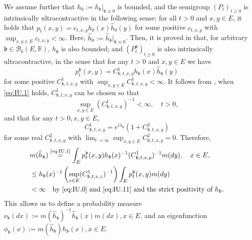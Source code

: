 \documentclass[12pt,a4paper]{amsart}
\numberwithin{equation}{section}
\theoremstyle{plain}
\theoremstyle{definition}
\theoremstyle{remark}
\begin{document}
	We assume further that $h_0:= h_\mathfrak b|_{\mathfrak{b} \equiv 0}$ is bounded, and the semigroup $(P_t)_{t\geq 0}$ is intrinsically ultracontractive in the following sense: for all $t>0$ and $x, y \in E$, it holds that $p_t(x,y) = c_{t,x,y} h_0(x) \widehat h_0(y)$ for some positive $c_{t,x,y}$ with $\sup_{x,y \in E} c_{t,x,y}< \infty$.
	Here, $\widehat h_0 := \widehat h_\mathfrak b|_{\mathfrak{b}\equiv 0}$.
	Then, it is proved in \cite{RenSongZhang2015Limit, RenSongZhang2017Central} that, for arbitrary $\mathfrak b \in \mathcal B_b(E,\mathbb R)$, $h_\mathfrak b$ is also bounded; and $(P_t^\mathfrak b)_{t\geq 0}$ is also intrinsically ultracontractive, in the sense that for any $t> 0$ and $x,y \in E$ we have
\begin{equation} \label{eq:IU.1}
	p^\mathfrak b_t(x,y)
		  = C^1_{\mathfrak b,t,x,y}h_\mathfrak b(x) \widehat h_\mathfrak b (y)
	\end{equation}
		 for some positive $C^1_{\mathfrak b,t,x,y}$ with $\sup_{x,y \in E} C^1_{\mathfrak b,t,x,y}< \infty$.
It follows from \cite[Proposition 2.5 and Theorem 2.7]{KimSong2008Intrinsic}, when \eqref{eq:IU.1} holds, $C^1_{\mathfrak b,t,x,y}$ can be chosen so that
\begin{equation} \label{eq:IU.11}
		\sup_{x,y \in E} (C^1_{\mathfrak b,t,x,y})^{-1}
	< \infty,
	\quad t>0,
\end{equation}
	and that for any $t>0, x,y \in E$,
\begin{equation}\label{eq:IU.2}
		C^1_{\mathfrak b,t,x,y}
	= e^{t\lambda_\mathfrak{b}} (1+ C^2_{\mathfrak b,t,x,y})
\end{equation}
		for some real $C^2_{\mathfrak b,t,x,y}$ with $\lim_{t\to \infty} \sup_{x,y \in E} C^2_{\mathfrak b,t,x,y} =0$.
	Therefore,
\begin{align}
		& m(\widehat h_{\mathfrak b}) \overset{\text{\eqref{eq:IU.1}}}= \int_{E} p_t^\mathfrak{b}(x,y)h_\mathfrak{b}(x)^{-1} (C^1_{\mathfrak b,t,x,y})^{-1} m(dy), \quad x\in E,
		\\&\leq  h_\mathfrak{b}(x)^{-1} \left(\sup_{z\in E}(C^1_{\mathfrak b,t,x,z})^{-1}\right)  \int_{E} p_t^\mathfrak{b}(x,y)m(dy)
	\\& < \infty \quad\text{by \eqref{eq:IU.0} and \eqref{eq:IU.11} and the strict positivity of $h_\mathfrak{b}$}.
\end{align}
	This allows us to define a probability measure $\nu_\mathfrak b (dx):= m(\widehat h_{\mathfrak b})^{-1} \widehat h_\mathfrak b (x)m(dx), x\in E$, and an eigenfunction $\phi_\mathfrak{b}(x) := m(\widehat h_{\mathfrak b}) h_\mathfrak b(x), x\in E$.
\end{document}
